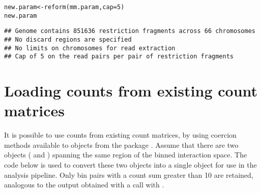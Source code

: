 \documentclass{report}\usepackage[]{graphicx}\usepackage[usenames,dvipsnames]{color}
\newcommand{\hlnum}[1]{\textcolor[rgb]{0.816,0.125,0.439}{#1}}%
\newcommand{\hlstr}[1]{\textcolor[rgb]{0.251,0.627,0.251}{#1}}%
\newcommand{\hlopt}[1]{\textcolor[rgb]{0,0,0}{#1}}%
\newcommand{\hlstd}[1]{\textcolor[rgb]{0.251,0.251,0.251}{#1}}%
\newcommand{\hlkwb}[1]{\textcolor[rgb]{0,0,0}{#1}}%
\newcommand{\hlkwc}[1]{\textcolor[rgb]{0.251,0.251,0.251}{#1}}%
\newcommand{\hlkwd}[1]{\textcolor[rgb]{0.878,0.439,0.125}{#1}}%
\newenvironment{knitrout}{}{} %
\begin{document}
\begin{knitrout}
\color{fgcolor}\begin{kframe}
\begin{alltt}
\hlstd{new.param} \hlkwb{<-} \hlkwd{reform}\hlstd{(mm.param,} \hlkwc{cap}\hlstd{=}\hlnum{5}\hlstd{)}
\hlstd{new.param}
\end{alltt}
\begin{verbatim}
## Genome contains 851636 restriction fragments across 66 chromosomes
## No discard regions are specified
## No limits on chromosomes for read extraction
## Cap of 5 on the read pairs per pair of restriction fragments
\end{verbatim}
\end{kframe}
\end{knitrout}

\section{Loading counts from existing count matrices}
It is possible to use counts from existing count matrices, by using coercion methods available to  objects from the  package \cite{lun2016infrastructure}.
Assume that there are two  objects ( and ) spanning the same region of the binned interaction space.
The code below is used to convert these two objects into a single  object for use in the  analysis pipeline.
Only bin pairs with a count sum greater than 10 are retained, analogous to the output obtained with a  call with .



\begin{knitrout}
\color{fgcolor}
\end{knitrout}
\end{document}
